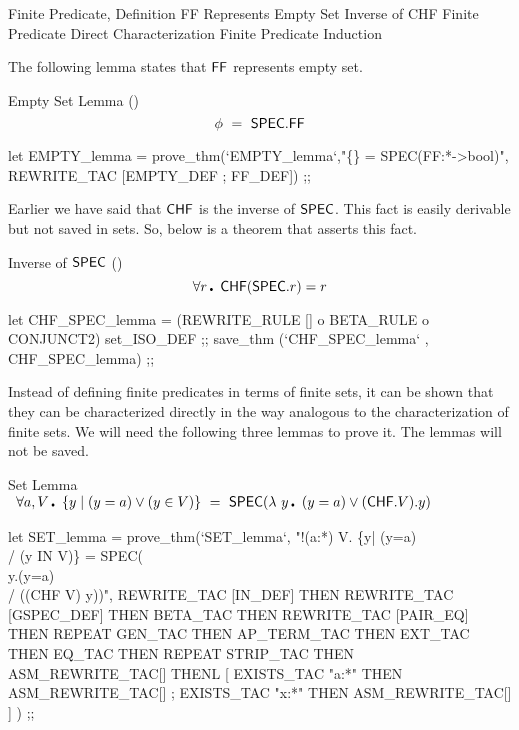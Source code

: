 \enddocs
{}
\endmoddef
\LA{}Finite Predicate, Definition\RA{}
\LA{}FF Represents Empty Set\RA{}
\LA{}Inverse of CHF\RA{}
\LA{}Finite Predicate Direct Characterization\RA{}
\LA{}Finite Predicate Induction\RA{}
\endcode
{}


The following lemma states that $\mbox{\sf FF}$ represents empty set.

\begin{theorem}{Empty Set Lemma ()}
\[ \Empty \ = \ \SPEC.\FF \]
\end{theorem}

\enddocs
{}
\endmoddef
let EMPTY_lemma = prove_thm(`EMPTY_lemma`,"\{\} = SPEC(FF:*->bool)",
    REWRITE_TAC [EMPTY_DEF ; FF_DEF]) ;;
\endcode
{}


Earlier we have said that ${\sf CHF}$ is the inverse of ${\sf SPEC}$. This fact
is easily derivable but not saved in \code{}sets\edoc{}. So, below is a theorem
that asserts this fact.

\begin{theorem}{Inverse of ${\sf SPEC}$ ()}
\[ \qA r\Dot \CHF(\SPEC.r) = r \]
\end{theorem}

\enddocs
{}
\endmoddef
let CHF_SPEC_lemma = (REWRITE_RULE [] o BETA_RULE o CONJUNCT2) set_ISO_DEF ;;
save_thm (`CHF_SPEC_lemma` , CHF_SPEC_lemma) ;;
\endcode
{}


Instead of defining finite predicates in terms of finite sets, it can
be shown that they can be characterized directly in the way analogous
to the characterization of finite sets. We will need the following
three lemmas to prove it. The lemmas will not be saved.

\begin{theorem}{Set Lemma}
\Eline
$\begin{array}{l}
  \qA a,V\Dot \Set{y \mid  (y=a) \OR (y\in V)}\ = \
               \SPEC(\lambda\ y\Dot (y=a) \OR (\CHF.V). y)
\end{array}$
\end{theorem}

\enddocs
{}
\endmoddef
let SET_lemma = prove_thm(`SET_lemma`,
   "!(a:*) V. \{y| (y=a) \\/ (y IN V)\} = SPEC(\\y.(y=a) \\/ ((CHF V) y))",
   REWRITE_TAC [IN_DEF] THEN REWRITE_TAC [GSPEC_DEF]
   THEN BETA_TAC THEN REWRITE_TAC [PAIR_EQ] THEN REPEAT GEN_TAC
   THEN AP_TERM_TAC THEN EXT_TAC
   THEN EQ_TAC THEN REPEAT STRIP_TAC
   THEN ASM_REWRITE_TAC[]
   THENL [ EXISTS_TAC "a:*" THEN ASM_REWRITE_TAC[] ;
           EXISTS_TAC "x:*" THEN ASM_REWRITE_TAC[] ] ) ;;
\endcode
{}


